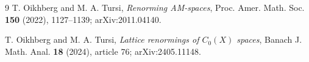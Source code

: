\documentclass[10pt]{article}
\begin{document}
\begin{thebibliography}{9}
T. Oikhberg and M. A. Tursi,
\emph{Renorming AM-spaces}, Proc. Amer. Math. Soc. \textbf{150} (2022),
1127--1139; arXiv:2011.04140.

T. Oikhberg and M. A. Tursi,
\emph{Lattice renormings of $C_0(X)$ spaces}, Banach J. Math. Anal.
\textbf{18} (2024), article 76; arXiv:2405.11148.
\end{thebibliography}
\end{document}
